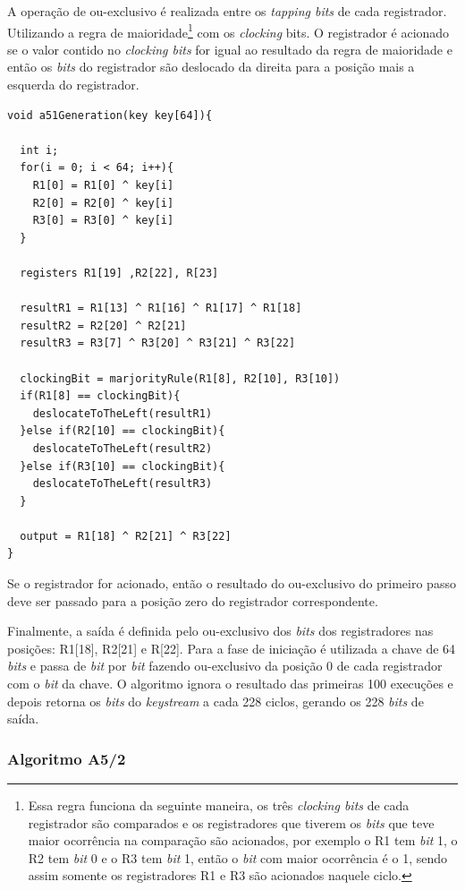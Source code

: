 A operação de ou-exclusivo é realizada entre os \textit{tapping bits} de cada registrador. Utilizando a regra de maioridade\footnote{Essa regra funciona da seguinte maneira, os três \textit{clocking bits} de cada registrador são comparados e os registradores que tiverem os \textit{bits} que teve maior ocorrência na comparação são acionados, por exemplo o R1 tem \textit{bit} 1, o R2 tem \textit{bit} 0 e o R3 tem \textit{bit} 1, então o \textit{bit} com maior ocorrência é o 1, sendo assim somente os registradores R1 e R3 são acionados naquele ciclo.} com os \textit{clocking} bits. O registrador é acionado se o valor contido no \textit{clocking bits} for igual ao resultado da regra de maioridade e então os \textit{bits} do registrador são deslocado da direita para a posição mais a esquerda do registrador.

\begin{lstlisting}[caption={Pseudo-código A5/1}, label=a51-pseudo-code]
void a51Generation(key key[64]){

  int i;
  for(i = 0; i < 64; i++){
  	R1[0] = R1[0] ^ key[i]
	R2[0] = R2[0] ^ key[i]
	R3[0] = R3[0] ^ key[i]  
  }

  registers R1[19] ,R2[22], R[23]
  
  resultR1 = R1[13] ^ R1[16] ^ R1[17] ^ R1[18]
  resultR2 = R2[20] ^ R2[21]
  resultR3 = R3[7] ^ R3[20] ^ R3[21] ^ R3[22]
  
  clockingBit = marjorityRule(R1[8], R2[10], R3[10])
  if(R1[8] == clockingBit){
  	deslocateToTheLeft(resultR1)
  }else if(R2[10] == clockingBit){
    deslocateToTheLeft(resultR2)
  }else if(R3[10] == clockingBit){
    deslocateToTheLeft(resultR3)
  }
  
  output = R1[18] ^ R2[21] ^ R3[22]
}
    \end{lstlisting}

Se o registrador for acionado, então o resultado do ou-exclusivo do primeiro passo deve ser passado para a posição zero do registrador correspondente.

Finalmente, a saída é definida pelo ou-exclusivo dos \textit{bits} dos registradores nas posições: R1[18], R2[21] e R[22]. Para a fase de iniciação é utilizada a chave de 64 \textit{bits} e passa de \textit{bit} por \textit{bit} fazendo ou-exclusivo da posição 0 de cada registrador com o \textit{bit} da chave. O algoritmo ignora o resultado das primeiras 100 execuções e depois retorna os \textit{bits} do \textit{keystream} a cada 228 ciclos, gerando os 228 \textit{bits} de saída.

\subsubsection{Algoritmo A5/2}
\label{algorithm-a52}

